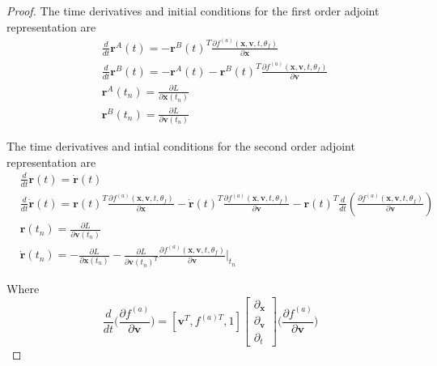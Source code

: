 \documentclass{article}
\theoremstyle{remark}
\theoremstyle{definition}
\begin{document}
\begin{proof}
The time derivatives and initial conditions for the first order adjoint representation are
\begin{equation}
\label{eq: first_order_adjoint_final}
\begin{aligned}
    & \frac{d}{dt}\mathbf{r}^{A}(t) = -\mathbf{r}^{B}(t)^{T}\frac{\partial f^{(a)}(\mathbf{x}, \mathbf{v}, t, \theta_{f})}{\partial \mathbf{x}}
    \\
& \frac{d}{dt}\mathbf{r}^{B}(t) = -\mathbf{r}^{A}(t) - \mathbf{r}^{B}(t)^{T}\frac{\partial f^{(a)}(\mathbf{x}, \mathbf{v}, t, \theta_{f})}{\partial \mathbf{v}}
    \\
&\mathbf{r}^{A}(t_{n}) = \frac{\partial L}{\partial \mathbf{x}(t_{n})}
    \\
&\mathbf{r}^{B}(t_{n}) = \frac{\partial L}{\partial \mathbf{v}(t_{n})}
\end{aligned}
\end{equation}

The time derivatives and intial conditions for the second order adjoint representation are
\begin{equation}
\label{eq: second_order_adjoint_final}
\begin{aligned}
    & \frac{d}{dt}\mathbf{r}(t) = \dot{\mathbf{r}}(t)
    \\
& \frac{d}{dt}\dot{\mathbf{r}}(t) = 
    \mathbf{r}(t)^{T}\frac{\partial f^{(a)}(\mathbf{x},\mathbf{v},t,\theta_{f})}{\partial \mathbf{x}}
    -\dot{\mathbf{r}}(t)^{T}\frac{\partial f^{(a)}(\mathbf{x},\mathbf{v},t,\theta_{f})}{\partial \mathbf{v}}
    - \mathbf{r}(t)^{T}\frac{d}{dt}\left(
    \frac{\partial f^{(a)}(\mathbf{x},\mathbf{v},t,\theta_{f})}{\partial \mathbf{v}}
    \right)
    \\
&\mathbf{r}(t_{n}) = \frac{\partial L}{\partial \mathbf{v}(t_{n})}
    \\
&\dot{\mathbf{r}}(t_{n}) = -\frac{\partial L}{\partial \mathbf{x}(t_{n})}
    -\frac{\partial L}{\partial \mathbf{v}(t_{n})^{T}}
    \frac{\partial f^{(a)}(\mathbf{x},\mathbf{v}, t, \theta_{f})}{\partial \mathbf{v}}\Biggr\vert_{t_{n}}
\end{aligned}
\end{equation}

Where
\begin{equation}
    \frac{d}{dt}\Biggr(\frac{\partial f^{(a)}}{\partial \mathbf{v}}\Biggr)=
    [\mathbf{v}^{T}, f^{(a)T}, 1]
    \begin{bmatrix}
    \partial_{\mathbf{x}}
    \\
    \partial_{\mathbf{v}}
    \\
    \partial_{t}
    \end{bmatrix}
    \Biggr(\frac{\partial f^{(a)}}{\partial \mathbf{v}}\Biggr)
\end{equation}


\end{proof}
\end{document}

